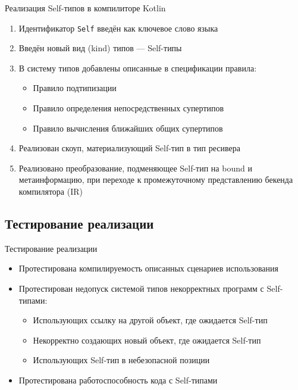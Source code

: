 \documentclass[handout,aspectratio=169,usenames,dvipsnames]{beamer}
\begin{document}
    \begin{frame}{Реализация Self-типов в компилиторе Kotlin}
        \begin{enumerate}
            \item Идентификатор \texttt{Self} введён как ключевое слово языка
            \item Введён новый вид (kind) типов --- Self-типы
            \item В систему типов добавлены описанные в спецификации правила:
            \begin{itemize}
                \item Правило подтипизации
                \item Правило определения непосредственных супертипов
                \item Правило вычисления ближайших общих супертипов
            \end{itemize}
            \item Реализован скоуп, материализующий Self-тип в тип ресивера
            \item Реализовано преобразование, подменяющее Self-тип на bound и метаинформацию, при переходе к промежуточному представлению бекенда компилятора (IR)
        \end{enumerate}
    \end{frame}

    \subsection{Тестирование реализации}

    \begin{frame}{Тестирование реализации}
        \begin{itemize}
            \item Протестирована компилируемость описанных сценариев использования
            \item Протестирован недопуск системой типов некорректных программ с Self-типами:
            \begin{itemize}
                \item Использующих ссылку на другой объект, где ожидается Self-тип
                \item Некорректно создающих новый объект, где ожидается Self-тип
                \item Использующих Self-тип в небезопасной позиции
            \end{itemize}
            \item Протестирована работоспособность кода с Self-типами
        \end{itemize}
    \end{frame}
\end{document}
